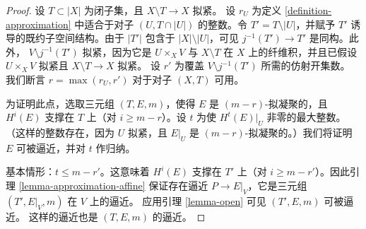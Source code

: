 \begin{proof}
设 $T \subset |X|$ 为闭子集，且 $X \setminus T \to X$ 拟紧。
设 $r_U$ 为定义 \ref{definition-approximation} 中适合于对子
$(U, T \cap |U|)$ 的整数。令 $T' = T \setminus |U|$，并赋予
$T'$ 诱导的既约子空间结构。由于 $|T'|$ 包含于
$|X| \setminus |U|$，可见 $j^{-1}(T') \to T'$ 是同构。此外，
$V \setminus j^{-1}(T')$ 拟紧，因为它是 $U \times_X V$ 与
$X \setminus T$ 在 $X$ 上的纤维积，并且已假设
$U \times_X V$ 拟紧且 $X \setminus T \to X$ 拟紧。
设 $r'$ 为覆盖 $V \setminus j^{-1}(T')$ 所需的仿射开集数。
我们断言 $r = \max(r_U, r')$ 对于对子 $(X, T)$ 可用。

\medskip\noindent
为证明此点，选取三元组 $(T, E, m)$，使得 $E$ 是
$(m - r)$-拟凝聚的，且 $H^i(E)$ 支撑在 $T$ 上（对
$i \geq m - r$）。设 $t$ 为使 $H^t(E)|_U$ 非零的最大整数。
（这样的整数存在，因为 $U$ 拟紧，且 $E|_U$ 是
$(m - r)$-拟凝聚的。）我们将证明 $E$ 可被逼近，并对 $t$ 作归纳。

\medskip\noindent
基本情形：$t \leq m - r'$。这意味着 $H^i(E)$ 支撑在
$T'$ 上（对 $i \geq m - r'$）。因此引理
\ref{lemma-approximation-affine} 保证存在逼近
$P \to E|_V$，它是三元组 $(T', E|_V, m)$ 在 $V$ 上的逼近。
应用引理 \ref{lemma-open} 可见 $(T', E, m)$ 可被逼近。
这样的逼近也是 $(T, E, m)$ 的逼近。


\end{proof}
